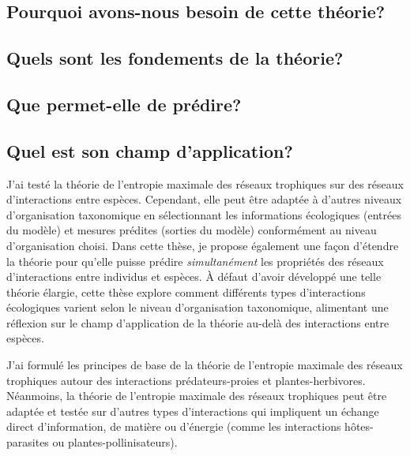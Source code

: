 \subsection{Pourquoi avons-nous besoin de cette théorie?} 

\subsection{Quels sont les fondements de la théorie?} 

\subsection{Que permet-elle de prédire?} 

\subsection{Quel est son champ d'application?} 

J'ai testé la théorie de l'entropie maximale des réseaux trophiques sur des
réseaux d'interactions entre espèces. Cependant, elle peut être adaptée à
d'autres niveaux d'organisation taxonomique en sélectionnant les informations
écologiques (entrées du modèle) et mesures prédites (sorties du modèle)
conformément au niveau d'organisation choisi. Dans cette thèse, je propose
également une façon d'étendre la théorie pour qu'elle puisse prédire
\textit{simultanément} les propriétés des réseaux d'interactions entre individus
et espèces. À défaut d'avoir développé une telle théorie élargie, cette thèse
explore comment différents types d'interactions écologiques varient selon le
niveau d'organisation taxonomique, alimentant une réflexion sur le champ
d'application de la théorie au-delà des interactions entre espèces. 

J'ai formulé les principes de base de la théorie de l'entropie maximale des
réseaux trophiques autour des interactions prédateurs-proies et
plantes-herbivores. Néanmoins, la théorie de l'entropie maximale des réseaux
trophiques peut être adaptée et testée sur d'autres types d'interactions qui
impliquent un échange direct d'information, de matière ou d'énergie (comme les
interactions hôtes-parasites ou plantes-pollinisateurs).

